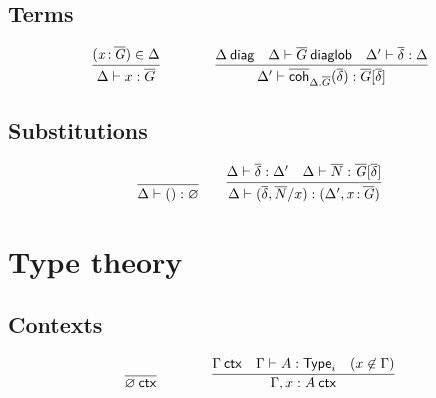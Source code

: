 \subsection{Terms}

\begin{small}
  \[
  \infer{\ofdiaglob{\Delta}{x}{\diag G}}
  {(\tptm{x}{\diag G})\in\Delta}
  \qquad\qquad
  \infer{\ofdiaglob{\Delta'}{\diagcoh{\Delta.\diag G}{\diag\delta}}
    {\diag G[\diag\delta]}}
  {\wfdiag{\Delta} 
    & \wfdiaglob{\Delta}{\diag G}
    & \substdiaglob{\Delta'}{\diag\delta}{\Delta}}
  \]
\end{small}

\subsection{Substitutions}

\begin{small}
  \[
  \infer{\substdiaglob{\Delta}{()}{\emptyctx}}
  {}
  \qquad
  \infer{\substdiaglob{\Delta}{(\diag \delta,\diag N/x)}
    {(\Delta',\tptm{x}{\diag G})}}
  {\substdiaglob{\Delta}{\diag \delta}{\Delta'}
    & \ofdiaglob{\Delta}{\diag N}{\tsubst{\diag G}{\diag \delta}}}
  \]
\end{small}

\section{Type theory}

\subsection{Contexts}

\begin{small}
  \[
  \infer{\wfctx{\varnothing}}{}
  \qquad\qquad
  \infer{\wfctx{\Gamma,x:A}}
  {\wfctx{\Gamma}
    & \wftype{\Gamma}{A}
    & (x\not\in\Gamma)}
  \]
\end{small}



